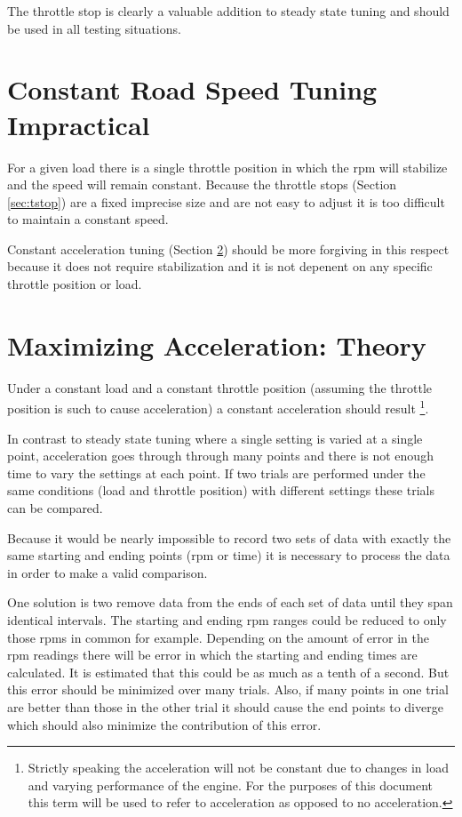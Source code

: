 \documentclass{article}
\begin{document}
The throttle stop is clearly a valuable addition to steady
state tuning and should be used in all testing situations.

\section{Constant Road Speed Tuning Impractical}

For a given load there is a single throttle position in which
the rpm will stabilize and the speed will remain constant.
Because the throttle stops (Section \ref{sec:tstop}) are a fixed
imprecise size and are not easy to adjust it is too difficult
to maintain a constant speed.

Constant acceleration tuning (Section \ref{sec:conacc})
should be more forgiving in this respect because it does not require
stabilization and it is not depenent on any specific throttle position
or load.

\section{Maximizing Acceleration: Theory}
\label{sec:conacc}

Under a constant load and a constant throttle position
(assuming the throttle position is such to cause acceleration)
a constant acceleration should result
\footnote{Strictly speaking the acceleration will not be constant due to
changes in load and varying performance of the engine.
For the purposes of this document this term will be used to
refer to acceleration as opposed to no acceleration.}.

In contrast to steady state tuning where a single setting is varied
at a single point, acceleration goes through through many points
and there is not enough time to vary the settings at each point.
If two trials are performed under the same conditions (load and throttle
position) with different settings these trials can be compared.

Because it would be nearly impossible to record two sets of data with
exactly the same starting and ending points (rpm or time) it
is necessary to process the data in order to make a valid comparison.

One solution is two remove data from the ends of each set of data until
they span identical intervals.
The starting and ending rpm ranges could be reduced to only those rpms
in common for example.
Depending on the amount of error in the rpm readings there will be error
in which the starting and ending times are calculated.
It is estimated that this could be as much as a tenth of a second.
But this error should be minimized over many trials.
Also, if many points in one trial are better than those in the other
trial it should cause the end points to diverge which should also minimize
the contribution of this error.
\end{document}
